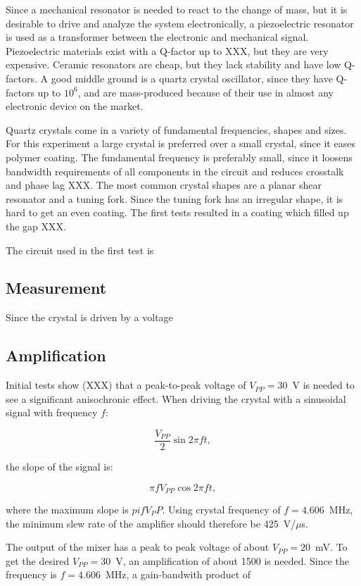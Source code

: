 Since a mechanical resonator is needed to react to the change of mass, but it is desirable to drive and analyze the system electronically, a piezoelectric resonator is used as a transformer between the electronic and mechanical signal. Piezoelectric materials exist with a Q-factor up to XXX, but they are very expensive. Ceramic resonators are cheap, but they lack stability and have low Q-factors. A good middle ground is a quartz crystal oscillator, since they have Q-factors up to $10^6$, and are mass-produced because of their use in almost any electronic device on the market. 

Quartz crystals come in a variety of fundamental frequencies, shapes and sizes. For this experiment a large crystal is preferred over a small crystal, since it eases polymer coating. The fundamental frequency is preferably small, since it loosens bandwidth requirements of all components in the circuit and reduces crosstalk and phase lag XXX. The most common crystal shapes are a planar shear resonator and a tuning fork. Since the tuning fork has an irregular shape, it is hard to get an even coating. The first tests resulted in a coating which filled up the gap XXX. 

The circuit used in the first test is 

\subsection{Measurement}
Since the crystal is driven by a voltage 

\subsection{Amplification}
Initial tests show (XXX) that a peak-to-peak voltage of $V_{PP} = 30$~V is needed to see a significant anisochronic effect. When driving the crystal with a sinusoidal signal with frequency $f$:

$$\frac{V_{PP}}{2} \sin{2\pi ft},$$

the slope of the signal is:

\begin{equation}\label{eq:driving}
\pi fV_{PP} \cos{2\pi ft},
\end{equation}

where the maximum slope is $pi fV_PP$. Using crystal frequency of $f=4.606$~MHz, the minimum slew rate of the amplifier should therefore be 425~V/$\mu$s. 

The output of the mixer has a peak to peak voltage of about $V_{PP} = 20$~mV. To get the desired $V_{PP} = 30$~V, an amplification of about 1500 is needed. Since the frequency is $f=4.606$~MHz, a gain-bandwith product of 